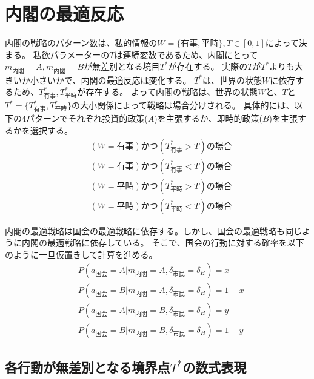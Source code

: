 \documentclass[main.tex]{subfiles}
\begin{document}
\section{内閣の最適反応}



内閣の戦略のパターン数は、私的情報の$W=\lbrace 有事, 平時\rbrace, T\in[0,1]$によって決まる。
私欲パラメーターの$T$は連続変数であるため、内閣にとって$m_{内閣}=A,m_{内閣}=B$が無差別となる境目$T^*$が存在する。
実際の$T$が$T^*$よりも大きいか小さいかで、内閣の最適反応は変化する。
$T^*$は、世界の状態$W$に依存するため、$T^*_{有事}, T^*_{平時}$が存在する。
よって内閣の戦略は、世界の状態$W$と、$T$と$T^* = \lbrace T^*_{有事}, T^*_{平時} \rbrace$の大小関係によって戦略は場合分けされる。
具体的には、以下の4パターンでそれぞれ投資的政策($A$)を主張するか、即時的政策($B$)を主張するかを選択する。
\begin{align*}
    & (W=有事) かつ (T^*_{有事}>T) の場合 \\
    & (W=有事) かつ (T^*_{有事}<T) の場合 \\
    & (W=平時) かつ (T^*_{平時}>T) の場合 \\
    & (W=平時) かつ (T^*_{平時}<T) の場合 
\end{align*}


内閣の最適戦略は国会の最適戦略に依存する。しかし、国会の最適戦略も同じように内閣の最適戦略に依存している。
そこで、国会の行動に対する確率を以下のように一旦仮置きして計算を進める。
\begin{align*}
    & P(a_{国会} = A| m_{内閣} = A, \delta_{市民} = \delta_H ) = x \\
    & P(a_{国会} = B| m_{内閣} = A, \delta_{市民} = \delta_H ) = 1-x \\
    & P(a_{国会} = A| m_{内閣} = B, \delta_{市民} = \delta_H ) = y \\
    & P(a_{国会} = B| m_{内閣} = B, \delta_{市民} = \delta_H ) = 1-y
\end{align*}






\subsection{各行動が無差別となる境界点$T^*$の数式表現}
\end{document}
